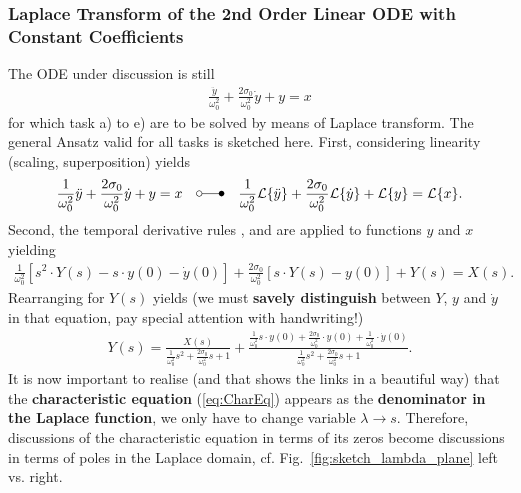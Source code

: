 \documentclass[11pt,a4paper,DIV=12]{scrartcl}
\begin{document}
\subsubsection{Laplace Transform of the 2nd Order Linear ODE with Constant Coefficients}
The ODE under discussion is still 
\begin{align}
\frac{\ddot{y}}{\omega_0^2} + \frac{2 \sigma_0}{\omega_0^2} \dot{y} + y = x
\end{align}
for which task a) to e) are to be solved by means of Laplace transform.
The general Ansatz valid for all tasks is sketched here.
%
First, considering linearity (scaling, superposition) yields
\begin{align}
\frac{1}{\omega_0^2} \ddot{y} +
\frac{2 \sigma_0}{\omega_0^2} \dot{y} + y = x
\quad \laplace \quad
\frac{1}{\omega_0^2} \mathcal{L}\{\ddot{y}\} +
\frac{2 \sigma_0}{\omega_0^2} \mathcal{L}\{\dot{y}\} + \mathcal{L}\{y\} =
\mathcal{L}\{x\}.
\end{align}
%
Second, the temporal derivative rules , 
and  are applied to functions $y$ and $x$ yielding
\begin{align}
\frac{1}{\omega_0^2} \left[ s^2 \cdot Y(s) - s \cdot y(0) - \dot{y}(0)\right]  +
\frac{2 \sigma_0}{\omega_0^2} \left[ s \cdot Y(s) - y(0) \right] + Y(s) = X(s).
\end{align}
%
Rearranging for $Y(s)$ yields (we must \textbf{savely distinguish} between $Y$, $y$ and $\dot{y}$
in that equation, pay special attention with handwriting!)
\begin{align}
Y(s) = \frac{X(s)}{\frac{1}{\omega_0^2} s^2 +
\frac{2 \sigma_0}{\omega_0^2} s + 1}
+ \frac{\frac{1}{\omega_0^2} s \cdot y(0) + \frac{2 \sigma_0}{\omega_0^2} \cdot y(0) +
\frac{1}{\omega_0^2} \cdot \dot{y}(0)}{\frac{1}
{\omega_0^2} s^2 + \frac{2 \sigma_0}{\omega_0^2} s + 1}.
\end{align}
%
It is now important to realise (and that shows the links in a beautiful way)
that the \textbf{characteristic equation} (\ref{eq:CharEq})
appears as the \textbf{denominator in the Laplace function}, we only have to change
variable $\lambda\rightarrow s$.
Therefore, discussions of the characteristic equation in terms of its zeros become
discussions in terms of poles in the Laplace domain,
cf. Fig.~\ref{fig:sketch_lambda_plane} left vs. right.
\end{document}
